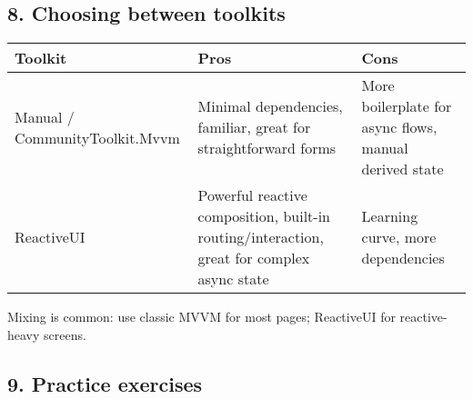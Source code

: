 \subsection{8. Choosing between
toolkits}\label{choosing-between-toolkits}

\begin{longtable}[]{@{}
  >{\raggedright\arraybackslash}p{}
  >{\raggedright\arraybackslash}p{}
  >{\raggedright\arraybackslash}p{}@{}}
\toprule\noalign{}
\begin{minipage}[b]{\linewidth}\raggedright
Toolkit
\end{minipage} & \begin{minipage}[b]{\linewidth}\raggedright
Pros
\end{minipage} & \begin{minipage}[b]{\linewidth}\raggedright
Cons
\end{minipage} \\
\midrule\noalign{}
\endhead
\bottomrule\noalign{}
\endlastfoot
Manual / CommunityToolkit.Mvvm & Minimal dependencies, familiar, great
for straightforward forms & More boilerplate for async flows, manual
derived state \\
ReactiveUI & Powerful reactive composition, built-in
routing/interaction, great for complex async state & Learning curve,
more dependencies \\
\end{longtable}

Mixing is common: use classic MVVM for most pages; ReactiveUI for
reactive-heavy screens.

\subsection{9. Practice exercises}\label{practice-exercises-5}

